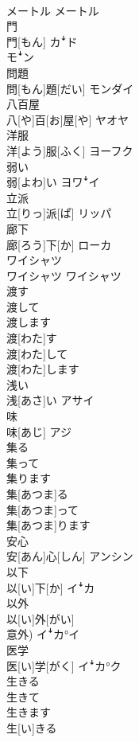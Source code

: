 \documentclass[8pt]{extreport}
\begin{document}
\begin{CJK}{UTF8}{min}
\\	メートル	メートル
\\	門	
\\	門[もん]	カꜜド 
\\	モꜜン
\\	問題	
\\	問[もん]題[だい]	モンダイ
\\	八百屋	
\\	八[や]百[お]屋[や]	ヤオヤ
\\	洋服	
\\	洋[よう]服[ふく]	ヨーフク
\\	弱い	
\\	弱[よわ]い	ヨワꜜイ
\\	立派	
\\	立[りっ]派[ぱ]	リッパ
\\	廊下	
\\	廊[ろう]下[か]	ローカ
\\	ワイシャツ	
\\	ワイシャツ	ワイシャツ
\\	渡す 
\\	渡して 
\\	渡します	
\\	渡[わた]す 
\\	渡[わた]して 
\\	渡[わた]します	
\\	浅い	
\\	浅[あさ]い	アサイ
\\	味	
\\	味[あじ]	アジ
\\	集る 
\\	集って 
\\	集ります	
\\	集[あつま]る 
\\	集[あつま]って 
\\	集[あつま]ります	
\\	安心	
\\	安[あん]心[しん]	アンシン
\\	以下	
\\	以[い]下[か]	イꜜカ
\\	以外	
\\	以[い]外[がい] 
\\	意外)	イꜜカ°イ
\\	医学	
\\	医[い]学[がく]	イꜜカ°ク
\\	生きる 
\\	生きて 
\\	生きます	
\\	生[い]きる 

\end{CJK}
\end{document}
